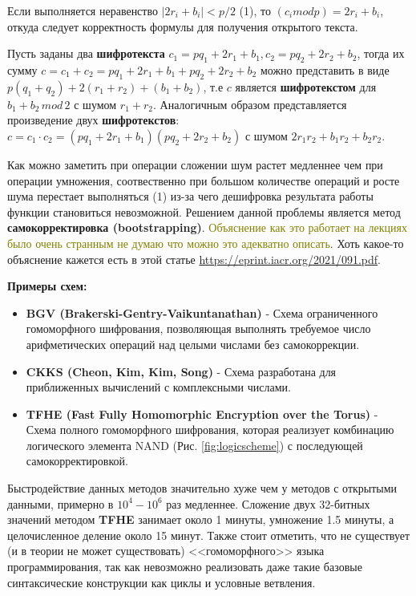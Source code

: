 Если выполняется неравенство $|2r_i+b_i| < p/2$ (1), то $(c_i mod p) = 2r_i + b_i$, откуда следует корректность формулы для получения открытого текста.

Пусть заданы два \textbf{шифротекста} $c_1 = pq_1+2r_1+b_1, c_2 = pq_2+2r_2+b_2$, тогда их сумму $c = c_1+c_2 = pq_1+2r_1+b_1 + pq_2+2r_2+b_2$ можно представить в виде $p(q_1+q_2) + 2(r_1+r_2) + (b_1 + b_2)$, т.е $c$ является \textbf{шифротекстом} для $b_1 + b_2 \, mod \, 2$ с шумом $r_1 + r_2$. Аналогичным образом представляется произведение двух \textbf{шифротекстов}: $c = c_1 \cdot c_2 = (pq_1+2r_1+b_1)(pq_2+2r_2+b_2)$ с шумом $2r_1r_2 + b_1r_2 + b_2r_2$.

Как можно заметить при операции сложении шум растет медленнее чем при операции умножения, соотвественно при большом количестве операций и росте шума перестает выполняться (1) из-за чего дешифровка результата работы функции становиться невозможной. Решением данной проблемы является метод \textbf{самокорректировка (bootstrapping)}.  \textcolor{olive} {Объяснение как это работает на лекциях было очень странным не думаю что можно это адекватно описать}. Хоть какое-то объяснение кажется есть в этой статье \url{https://eprint.iacr.org/2021/091.pdf}.

\textbf{Примеры схем:}
\begin{itemize}
\item \textbf{BGV (Brakerski-Gentry-Vaikuntanathan)} - Схема ограниченного гомоморфного шифрования, позволяющая выполнять требуемое число арифметических операций над целыми числами без самокоррекции. 
\item \textbf{CKKS (Cheon, Kim, Kim, Song)} - Схема разработана для приближенных вычислений с комплексными числами.
\item \textbf{TFHE (Fast Fully Homomorphic Encryption over the Torus)} - Схема полного гомоморфного шифрования, которая реализует комбинацию логического элемента NAND (Рис. \ref{fig:logicscheme}) с последующей самокорректировкой. 
\end{itemize}

Быстродействие данных методов значительно хуже чем у методов с открытыми данными, примерно в $10^4-10^6$ раз медленнее. Сложение двух 32-битных значений методом \textbf{TFHE} занимает около 1 минуты, умножение 1.5 минуты, а целочисленное деление около 15 минут. Также стоит отметить, что не существует (и в теории не может существовать) <<гомоморфного>> языка программирования, так как невозможно реализовать даже такие базовые синтаксические конструкции как циклы и условные ветвления. 

